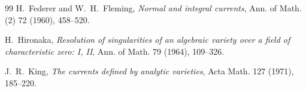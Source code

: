\documentclass[11pt,a4paper]{article}
\theoremstyle{definition}
\begin{document}
\begin{thebibliography}{99}
H.~Federer and W.~H.~Fleming,
\emph{Normal and integral currents},
Ann. of Math. (2) 72 (1960), 458--520.

H.~Hironaka,
\emph{Resolution of singularities of an algebraic variety over a field of characteristic zero: I, II},
Ann. of Math. 79 (1964), 109--326.

J.~R.~King,
\emph{The currents defined by analytic varieties},
Acta Math. 127 (1971), 185--220.
\end{thebibliography}
\end{document}
